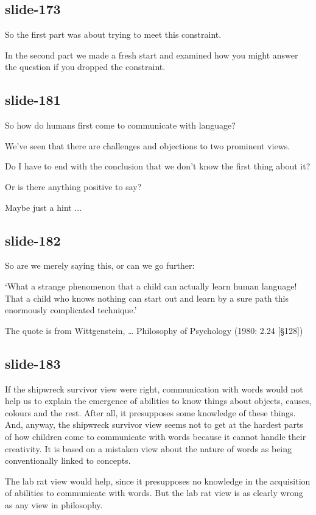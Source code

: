 \documentclass[12pt,\papersize]{extarticle}
\begin{document}
\subsection{slide-173}
So the first part was about trying to meet this constraint.
 
In the second part we made a fresh start and examined how you might answer the question if you dropped the constraint.
 
\subsection{slide-181}
So how do humans first come to communicate with language?
 
We've seen that there are challenges and objections to two prominent views.
 
Do I have to end with the conclusion that we don't know the first thing about it?
 
Or is there anything positive to say?
 
Maybe just a hint ...
 
\subsection{slide-182}
So are we merely saying this, or can we go further:
 
‘What a strange phenomenon that a child can actually learn human language!  That a child who knows nothing can start out and learn by a sure path this enormously complicated technique.’
 
The quote is from Wittgenstein, … Philosophy of Psychology (1980: 2.24 [§128])
 
\subsection{slide-183}
If the shipwreck survivor view were right, communication with words would not help us to explain
the emergence of abilities to know things about objects, causes, colours and the rest.
After all, it presupposes some knowledge of these things.
And, anyway, the shipwreck survivor view seems not to get at the hardest parts of how 
children come to communicate with words because it cannot handle their creativity.
It is based on a mistaken view about the nature of words as being conventionally linked to 
concepts.
 
The lab rat view would help, since it presupposes no knowledge in the acquisition of abilities 
to communicate with words.
But the lab rat view is as clearly wrong as any view in philosophy.
 
\end{document}
